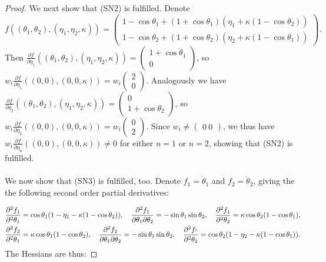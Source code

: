 \documentclass[10pt,a4paper]{amsart}
\begin{document}
\begin{proof}
We next show that (SN2) is fulfilled. Denote $$f((\theta_1,\theta_2),(\eta_1,\eta_2,\kappa)) = \begin{pmatrix}  1 - \cos\theta_1 + \left(1 + \cos\theta_1\right) \left(\eta_1 + \kappa \left(1 - \cos\theta_2\right)\right) \\  1 - \cos\theta_2 + \left(1 + \cos\theta_2\right) \left(\eta_2 + \kappa \left(1 - \cos\theta_1\right)\right)\end{pmatrix}.$$
Then $\frac{\partial f}{\partial \eta_1}((\theta_1,\theta_2),(\eta_1,\eta_2,\kappa)) = \begin{pmatrix}1 + \cos\theta_1 \\ 0\end{pmatrix}$, so $w_i\frac{\partial f}{\partial \eta_1}((0,0),(0,0,\kappa))=w_i\begin{pmatrix}2\\0\end{pmatrix}$. Analogously we have $\frac{\partial f}{\partial \eta_2}((\theta_1,\theta_2),(\eta_1,\eta_2,\kappa)) = \begin{pmatrix}0\\1 + \cos\theta_2\end{pmatrix}$, so $w_i\frac{\partial f}{\partial \eta_2}((0,0),(0,0,\kappa))=w_i\begin{pmatrix}0\\2\end{pmatrix}$. Since $w_i\neq\begin{pmatrix}0 \ 0\end{pmatrix}$, we thus have $w_i\frac{\partial f}{\partial \eta_n}((0,0),(0,0,\kappa))\neq0$ for either $n=1$ or $n=2$, showing that (SN2) is fulfilled.
\\ \\
We now show that (SN3) is fulfilled, too. Denote $f_1=\dot\theta_1$ and $f_2=\dot\theta_2$, giving the the following second order partial derivatives:

\begin{align*}
    \frac{\partial^2 f_1}{\partial^2 \theta_1} &= \cos\theta_1(1-\eta_1-\kappa(1-\cos\theta_2)),\quad
    \frac{\partial^2 f_1}{\partial \theta_1 \partial \theta_2} = -\sin\theta_1\sin\theta_2,\quad
    \frac{\partial^2 f_1}{\partial^2 \theta_2} = \kappa\cos\theta_2(1-\cos\theta_1),\\
    \frac{\partial^2 f_2}{\partial^2 \theta_1} &= \kappa\cos\theta_1(1-\cos\theta_2),\quad
    \frac{\partial^2 f_2}{\partial \theta_1 \partial \theta_2} = -\sin\theta_1\sin\theta_2, \quad
    \frac{\partial^2 f_"}{\partial^2 \theta_2} =  \cos\theta_2(1-\eta_2-\kappa(1-\cos\theta_1)).
\end{align*}
 The Hessians are thus:


\end{proof}
\end{document}
